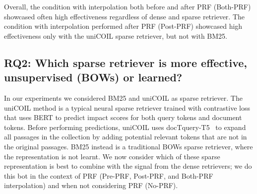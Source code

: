 
Overall, the condition with interpolation both before and after PRF (Both-PRF) showcased often high effectiveness regardless of dense and sparse retriever. The condition with interpolation performed after PRF (Post-PRF) showcased high effectiveness only with the uniCOIL sparse retriever, but not with BM25.



\vspace{-10pt}
\subsection{RQ2: Which sparse retriever is more effective, unsupervised (BOWs) or learned?}

In our experiments we considered BM25 and uniCOIL as sparse retriever. The uniCOIL method is a typical neural sparse retriever trained with contrastive loss that uses BERT to predict impact scores for both query tokens and document tokens. Before performing predictions, uniCOIL uses docTquery-T5~\cite{nogueira2019doc2query} to expand all passages in the collection by adding potential relevant tokens that are not in the original passages. BM25 instead is a traditional BOWs sparse retriever, where the representation is not learnt. We now consider which of these sparse representation is best to combine with the signal from the dense retrievers; we do this bot in the context of PRF (Pre-PRF, Post-PRF, and Both-PRF interpolation) and when not considering PRF (No-PRF).

